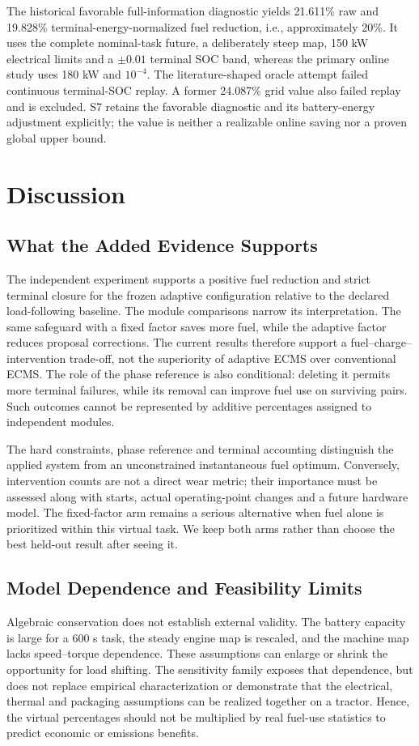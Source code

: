 \documentclass[energies,article,submit,moreauthors]{Definitions/mdpi}
\begin{document}
The historical favorable full-information diagnostic yields 21.611\% raw and 19.828\% terminal-energy-normalized fuel reduction, i.e., approximately 20\%. It uses the complete nominal-task future, a deliberately steep map, 150 kW electrical limits and a $\pm0.01$ terminal SOC band, whereas the primary online study uses 180 kW and $10^{-4}$. The literature-shaped oracle attempt failed continuous terminal-SOC replay. A former 24.087\% grid value also failed replay and is excluded. S7 retains the favorable diagnostic and its battery-energy adjustment explicitly; the value is neither a realizable online saving nor a proven global upper bound.

\section{Discussion}
\subsection{What the Added Evidence Supports}
The independent experiment supports a positive fuel reduction and strict terminal closure for the frozen adaptive configuration relative to the declared load-following baseline. The module comparisons narrow its interpretation. The same safeguard with a fixed factor saves more fuel, while the adaptive factor reduces proposal corrections. The current results therefore support a fuel--charge--intervention trade-off, not the superiority of adaptive ECMS over conventional ECMS. The role of the phase reference is also conditional: deleting it permits more terminal failures, while its removal can improve fuel use on surviving pairs. Such outcomes cannot be represented by additive percentages assigned to independent modules.

The hard constraints, phase reference and terminal accounting distinguish the applied system from an unconstrained instantaneous fuel optimum. Conversely, intervention counts are not a direct wear metric; their importance must be assessed along with starts, actual operating-point changes and a future hardware model. The fixed-factor arm remains a serious alternative when fuel alone is prioritized within this virtual task. We keep both arms rather than choose the best held-out result after seeing it.

\subsection{Model Dependence and Feasibility Limits}
Algebraic conservation does not establish external validity. The battery capacity is large for a 600 s task, the steady engine map is rescaled, and the machine map lacks speed--torque dependence. These assumptions can enlarge or shrink the opportunity for load shifting. The sensitivity family exposes that dependence, but does not replace empirical characterization or demonstrate that the electrical, thermal and packaging assumptions can be realized together on a tractor. Hence, the virtual percentages should not be multiplied by real fuel-use statistics to predict economic or emissions benefits.
\end{document}

